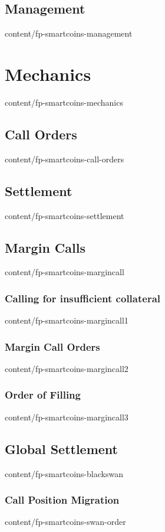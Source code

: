 \documentclass{btswhitepaper}
\begin{document}
\subsection    { Management                                       }  { content/fp-smartcoins-management  }

\section       { Mechanics                                        }  { content/fp-smartcoins-mechanics   }
\subsection    { Call Orders                                      }  { content/fp-smartcoins-call-orders }
\subsection    { Settlement                                       }  { content/fp-smartcoins-settlement  }
\subsection    { Margin Calls                                     }  { content/fp-smartcoins-margincall  }
\subsubsection { Calling for insufficient collateral              }  { content/fp-smartcoins-margincall1 }
\subsubsection { Margin Call Orders                               }  { content/fp-smartcoins-margincall2 }
\subsubsection { Order of Filling                                 }  { content/fp-smartcoins-margincall3 }

\subsection    { Global Settlement                                }  { content/fp-smartcoins-blackswan   }
\subsubsection { Call Position Migration                          }  { content/fp-smartcoins-swan-order  }
\end{document}
